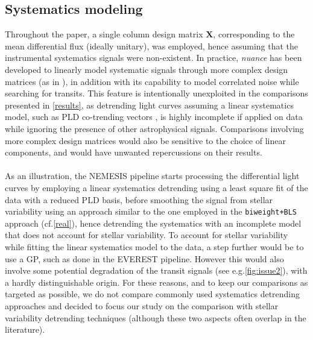 \documentclass[modern]{aastex631}
\newcommand{\nuancemethod}{\textit{nuance}}
\begin{document}
\subsection{Systematics modeling}
Throughout the paper, a single column design matrix $\bm{X}$, corresponding to the mean differential flux (ideally unitary), was employed, hence assuming that the instrumental systematics signals were non-existent. In practice, \nuancemethod{} has been developed to linearly model systematic signals through more complex design matrices (as in \citealt{foreman2016}), in addition with its capability to model correlated noise while searching for transits. This feature is intentionally unexploited in the comparisons presented in \autoref{results}, as detrending light curves assuming a linear systematics model, such as PLD co-trending vectors \citep{pld}, is highly incomplete if applied on data while ignoring the presence of other astrophysical signals. Comparisons involving more complex design matrices would also be sensitive to the choice of linear components, and would have unwanted repercussions on their results.\\\\
As an illustration, the NEMESIS pipeline \citep{nemesis} starts processing the differential light curves by employing a linear systematics detrending using a least square fit of the data with a reduced PLD basis, before smoothing the signal from stellar variability using an approach similar to the one employed in the \texttt{biweight+BLS} approach (cf.\;\autoref{real}), hence detrending the systematics with an incomplete model that does not account for stellar variability. To account for stellar variability while fitting the linear systematics model to the data, a step further would be to use a GP, such as done in the EVEREST \citep{everest2} pipeline. However this would also involve some potential degradation of the transit signals (see e.g.\;\autoref{fig:issue2}), with a hardly distinguishable origin. For these reasons, and to keep our comparisons as targeted as possible, we do not compare commonly used systematics detrending approaches and decided to focus our study on the comparison with stellar variability detrending techniques (although these two aspects often overlap in the literature).\\\\
\end{document}
